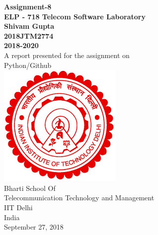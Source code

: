 \documentclass[a4paper,12pt]{article}
\begin{document}
\begin{center}
\textbf{Assignment-8 \\
\vspace{5mm}
ELP - 718 Telecom Software Laboratory \\
\vspace{2mm}
Shivam Gupta \\
2018JTM2774 \\
2018-2020} \\
\vspace{10mm}
A report presented for the assignment on \\
Python/Github \\
\vspace{30mm}
\includegraphics[scale=0.5]{iitlogo} \\
\vspace{10mm}
Bharti School Of \\
Telecommunication Technology and Management \\
IIT Delhi \\
India \\
September 27, 2018


\end{center}
\end{document}
